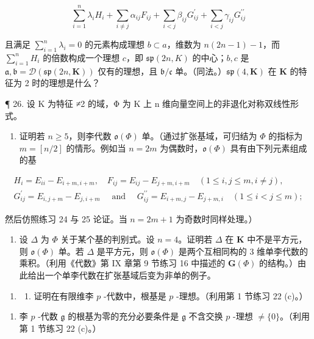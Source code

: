 \[
\sum_ {i = 1} ^ {n} \lambda_ {i} H _ {i} + \sum_ {i \neq j} \alpha_ {i j} F _ {i j} + \sum_ {i <   j} \beta_ {i j} G _ {i j} ^ {\prime} + \sum_ {i <   j} \gamma_ {i j} G _ {i j} ^ {\prime \prime}
\]

且满足 \(\sum_{i=1}^{n} \lambda_i = 0\) 的元素构成理想 \(b \subset a\)，维数为 \(n(2n - 1) - 1\)，而 \(\sum_{i=1}^{n} H_i\) 的倍数构成一个理想 \(c\)，即 \(\mathfrak{sp}(2n, K)\) 的中心；\(b, c\) 是 \(\mathfrak{a},\mathfrak{b} = \mathcal{D}(\mathfrak{sp}(2n,\mathbf{K}))\) 仅有的理想，且 \(\mathfrak{b} / \mathfrak{c}\) 单。（同法。）\(\mathfrak{sp}(4,\mathbf{K})\) 在 \(\mathbf{K}\) 的特征为 2 时的理想是什么？

¶ 26. 设 K 为特征 ≠2 的域，Φ 为 K 上 n 维向量空间上的非退化对称双线性形式。

\begin{enumerate}
\def\labelenumi{(\alph{enumi})}
\tightlist
\item
  证明若 \(n \geqslant 5\)，则李代数 \(\mathfrak{o}(\Phi)\) 单。（通过扩张基域，可归结为 \(\Phi\) 的指标为 \(m = [n/2]\) 的情形。例如当 \(n = 2m\) 为偶数时，\(\mathfrak{o}(\Phi)\) 具有由下列元素组成的基
\end{enumerate}

\[
\begin{array}{c} H _ {i} = E _ {i i} - E _ {i + m, i + m}, \quad F _ {i j} = E _ {i j} - E _ {j + m, i + m} \quad (1 \leqslant i, j \leqslant m, i \neq j), \\ G _ {i j} ^ {\prime} = E _ {i, j + m} - E _ {j, i + m} \quad \text { and } \quad G _ {i j} ^ {\prime \prime} = E _ {i + m, j} - E _ {j + m, i} \quad (1 \leqslant i <   j \leqslant m); \end{array}
\]

然后仿照练习 24 与 25 论证。当 \(n = 2m + 1\) 为奇数时同样处理。）

\begin{enumerate}
\def\labelenumi{(\alph{enumi})}
\setcounter{enumi}{1}
\tightlist
\item
  设 \(\Delta\) 为 \(\Phi\) 关于某个基的判别式。设 \(n = 4\)。证明若 \(\Delta\) 在 \(\mathbf{K}\) 中不是平方元，则 \(\mathfrak{o}(\Phi)\) 单。若 \(\Delta\) 是平方元，则 \(\mathfrak{o}(\Phi)\) 是两个互相同构的 3 维单李代数的乘积。（利用《代数》第 IX 章第 9 节练习 16 中描述的 \(\mathbf{G}(\Phi)\) 的结构。）由此给出一个单李代数在扩张基域后变为非单的例子。
\end{enumerate}

\begin{enumerate}
\def\labelenumi{\arabic{enumi}.}
\setcounter{enumi}{26}
\tightlist
\item
  \begin{enumerate}
  \def\labelenumii{(\alph{enumii})}
  \tightlist
  \item
    证明在有限维李 \(p\) -代数中，根基是 \(p\) -理想。（利用第 1 节练习 22 (c)。）
  \end{enumerate}
\end{enumerate}

\begin{enumerate}
\def\labelenumi{(\alph{enumi})}
\setcounter{enumi}{1}
\tightlist
\item
  李 \(p\) -代数 \(\mathfrak{g}\) 的根基为零的充分必要条件是 \(\mathfrak{g}\) 不含交换 \(p\) -理想 \(\neq \{0\}\)。（利用第 1 节练习 22 (c)。）
\end{enumerate}

